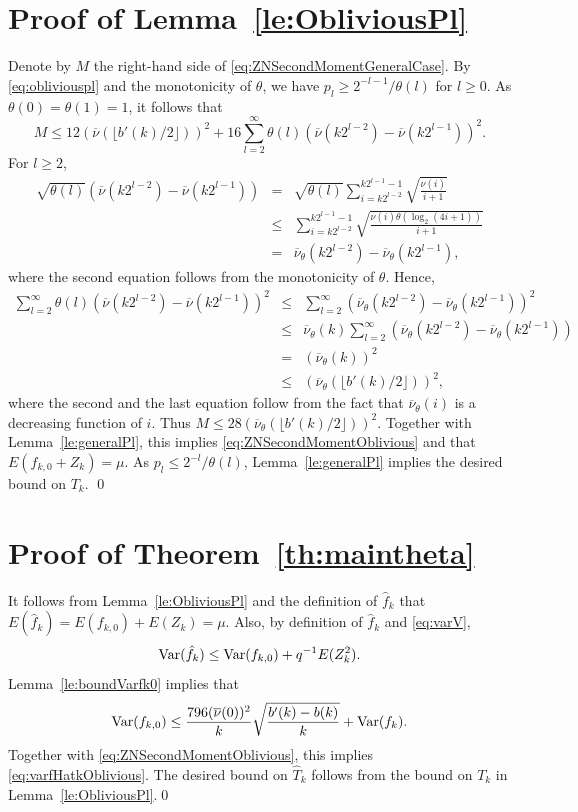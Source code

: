 \documentclass[a4paper,11pt]{article}
\begin{document}
\section{Proof of Lemma~\ref{le:ObliviousPl}}
Denote by \(M\) the right-hand side of \eqref{eq:ZNSecondMomentGeneralCase}. By \eqref{eq:obliviouspl} and the monotonicity of \(\theta\), we have \(p_{l}\ge2^{-l-1}/\theta(l)\) for \(l\geq0\). As \(\theta(0)=\theta(1)=1\), it follows that \begin{equation*}
M\le12(\overline{\nu}(\lfloor{b'(k)}/{2}\rfloor))^{2}+16\sum^{\infty}_{l=2}\theta(l)(\overline{\nu}(k2^{l-2})-\overline{\nu}(k2^{l-1}))^{2}.
\end{equation*}
For \(l\geq2\), \begin{eqnarray*}\sqrt{\theta(l)}(\overline{\nu}(k2^{l-2})-\overline{\nu}(k2^{l-1}))&=&\sqrt{\theta(l)}\sum^{k2^{l-1}-1}_{i=k2^{l-2}}\sqrt{\frac{\nu(i)}{i+1}}\\
&\le&\sum^{k2^{l-1}-1}_{i=k2^{l-2}}\sqrt{\frac{\nu(i)\theta(\log_{2}(4i+1))}{i+1}}\\&=& \overline{\nu}_{\theta}(k2^{l-2})-\overline{\nu}_{\theta}(k2^{l-1}),\end{eqnarray*}
where the second equation follows from the monotonicity of \(\theta\). Hence, \begin{eqnarray*}\sum^{\infty}_{l=2}\theta(l)(\overline{\nu}(k2^{l-2})-\overline{\nu}(k2^{l-1}))^{2}&\le&\sum^{\infty}_{l=2}(\overline{\nu}_{\theta}(k2^{l-2})-\overline{\nu}_{\theta}(k2^{l-1}))^{2}\\
&\le&\overline{\nu}_{\theta}(k)\sum^{\infty}_{l=2}(\overline{\nu}_{\theta}(k2^{l-2})-\overline{\nu}_{\theta}(k2^{l-1}))\\&=&(\overline{\nu}_{\theta}(k))^{2}\\&\le&(\overline{\nu}_{\theta}(\lfloor{b'(k)}/{2}\rfloor))^{2},
\end{eqnarray*}
where the second and the last equation follow from the fact that  \(\overline{\nu}_{\theta}(i)\) is a decreasing function of \(i\). Thus \(M\le28(\overline{\nu}_{\theta}(\lfloor{b'(k)}/{2}\rfloor))^{2}\). Together with Lemma~\ref{le:generalPl}, this implies \eqref{eq:ZNSecondMomentOblivious} and that  \(E(f_{k,0}+Z_{k})=\mu\).  As \(p_{l}\le2^{-l}/\theta(l)\),  Lemma~\ref{le:generalPl} implies the desired bound on \(T_{k}\).   
\qed
\section{Proof of Theorem~\ref{th:maintheta}}
It follows from Lemma~\ref{le:ObliviousPl}  and the definition of \(\hat f_{k}\) that \(E(\hat f_{k})=E(f_{k,0})+E(Z_{k})=\mu\). Also, by definition of \(\hat f_{k}\) and \eqref{eq:varV},\begin{equation*}
{\rm Var}(\hat f_{k})\le{\rm Var}(f_{k,0}) +q^{-1}E(Z_{k}^{2}).
\end{equation*}
Lemma~\ref{le:boundVarfk0} implies that \begin{displaymath}
{\rm Var}(f_{k,0})\leq\frac{796(\overline{\nu}(0))^{2}}{k}\sqrt{\frac{b'(k)-b(k)}{k}}+{\rm Var}(f_{k}).
\end{displaymath}
Together with \eqref{eq:ZNSecondMomentOblivious}, this implies \eqref{eq:varfHatkOblivious}.
The desired bound on    \(\hat T_{k}\) follows from the bound on \(T_{k}\) in Lemma~\ref{le:ObliviousPl}.\qed
\end{document}
